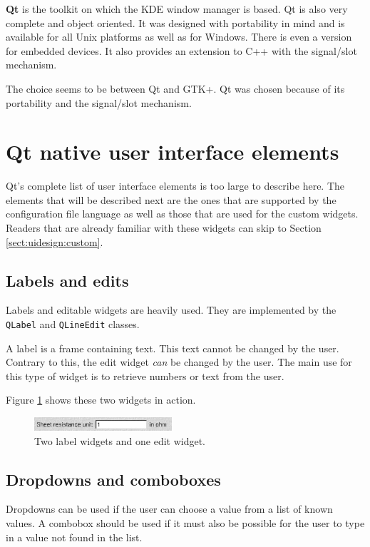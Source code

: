 \bigskip \noindent
\textbf{Qt} is the toolkit on which the KDE window manager is based. Qt
\cite{Qt} is also very complete and object oriented. It was designed with
portability in mind and is available for all Unix platforms as well as for
Windows. There is even a version for embedded devices. It also provides an
extension to C++ with the signal/slot mechanism.

\bigskip \noindent
The choice seems to be between Qt and GTK+. Qt was chosen because of its
portability and the signal/slot mechanism.

\section{Qt native user interface elements}
Qt's complete list of user interface elements is too large to describe here.
The elements that will be described next are the ones that are supported by the
configuration file language as well as those that are used for the custom
widgets. Readers that are already familiar with these widgets can skip to
Section \ref{sect:uidesign:custom}.

\subsection{Labels and edits}
Labels and editable widgets are heavily used. They are implemented by the
\verb=QLabel= and \verb=QLineEdit= classes.

A label is a frame containing text. This text cannot be changed by the user.
Contrary to this, the edit widget \emph{can} be changed by the user. The main
use for this type of widget is to retrieve numbers or text from the user.

Figure \ref{fig:uidesign:label_edit} shows these two widgets in action.

\begin{figure}[ht] \begin{center}
\includegraphics[height=5mm]{./figures/label_edit.eps}
\caption{Two label widgets and one edit widget.}
\label{fig:uidesign:label_edit}
\end{center} \end{figure}

\subsection{Dropdowns and comboboxes}
Dropdowns can be used if the user can choose a value from a list of known
values. A combobox should be used if it must also be possible for the user to
type in a value not found in the list.

